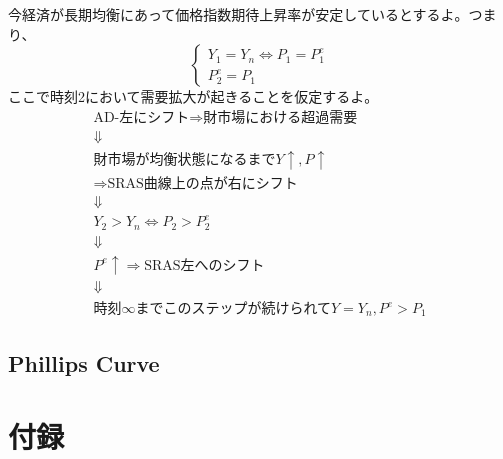 \documentclass[a4paper, 12pt]{article}
\begin{document}
今経済が長期均衡にあって価格指数期待上昇率が安定しているとするよ。つまり、
\begin{displaymath}
  \left\{\begin{array}{c}
    Y_1=Y_n \Leftrightarrow P_1=P_1^e \\
    P_2^e=P_1
  \end{array}\right.
\end{displaymath}
ここで時刻2において需要拡大が起きることを仮定するよ。
\begin{displaymath}
  \begin{array}{c}
    \text{AD-左にシフト}\Rightarrow \text{財市場における超過需要}\\
    \Downarrow \\
    \text{財市場が均衡状態になるまで}Y\uparrow, P\uparrow \\
    \Rightarrow \text{SRAS曲線上の点が右にシフト}\\
    \Downarrow \\
    Y_2>Y_n \Leftrightarrow P_2>P_2^e \\
    \Downarrow \\
    P^e \uparrow \Rightarrow \text{SRAS左へのシフト}\\
    \Downarrow \\
    \text{時刻}\infty \text{までこのステップが続けられて}Y=Y_n, P^e>P_1
  \end{array}
\end{displaymath}
\newpage

\subsection{Phillips Curve}



\section{付録}
\end{document}
